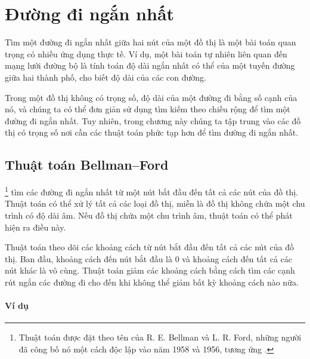 \chapter{Đường đi ngắn nhất}


Tìm một đường đi ngắn nhất giữa hai nút
của một đồ thị
là một bài toán quan trọng có nhiều
ứng dụng thực tế.
Ví dụ, một bài toán tự nhiên liên quan đến mạng lưới đường bộ
là tính toán độ dài ngắn nhất có thể của một tuyến đường
giữa hai thành phố, cho biết độ dài của các con đường.

Trong một đồ thị không có trọng số, độ dài của một đường đi bằng
số cạnh của nó, và chúng ta có thể
đơn giản sử dụng tìm kiếm theo chiều rộng để tìm
một đường đi ngắn nhất.
Tuy nhiên, trong chương này chúng ta tập trung vào
các đồ thị có trọng số
nơi cần các thuật toán phức tạp hơn
để tìm đường đi ngắn nhất.

\section{Thuật toán Bellman–Ford}


\footnote{Thuật toán được đặt theo tên của
R. E. Bellman và L. R. Ford, những người đã công bố nó một cách độc lập
vào năm 1958 và 1956, tương ứng \cite{bel58,for56a}.} tìm
các đường đi ngắn nhất từ một nút bắt đầu đến tất cả
các nút của đồ thị.
Thuật toán có thể xử lý tất cả các loại đồ thị,
miễn là đồ thị không chứa một
chu trình có độ dài âm.
Nếu đồ thị chứa một chu trình âm,
thuật toán có thể phát hiện ra điều này.

Thuật toán theo dõi các khoảng cách
từ nút bắt đầu đến tất cả các nút của đồ thị.
Ban đầu, khoảng cách đến nút bắt đầu là 0
và khoảng cách đến tất cả các nút khác là vô cùng.
Thuật toán giảm các khoảng cách bằng cách tìm
các cạnh rút ngắn các đường đi cho đến khi không
thể giảm bất kỳ khoảng cách nào nữa.

\subsubsection{Ví dụ}

